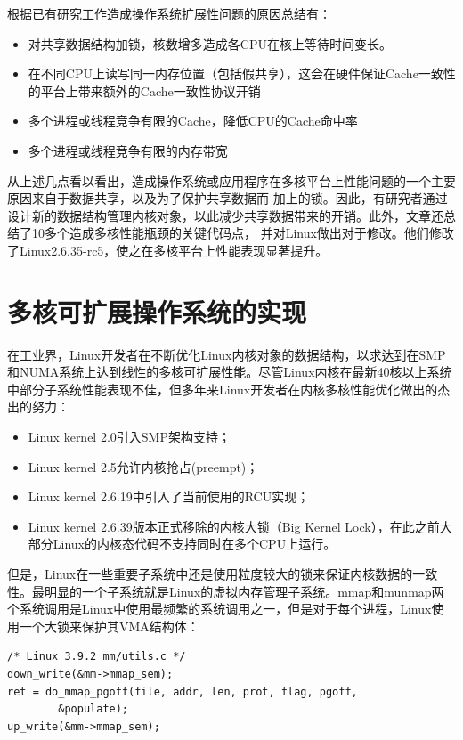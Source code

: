 根据已有研究工作造成操作系统扩展性问题的原因总结有：

\begin{itemize}
\item 对共享数据结构加锁，核数增多造成各CPU在核上等待时间变长。
\item 在不同CPU上读写同一内存位置（包括假共享），这会在硬件保证Cache一致性的平台上带来额外的Cache一致性协议开销
\item 多个进程或线程竞争有限的Cache，降低CPU的Cache命中率
\item 多个进程或线程竞争有限的内存带宽
\end{itemize}

从上述几点看以看出，造成操作系统或应用程序在多核平台上性能问题的一个主要原因来自于数据共享，以及为了保护共享数据而
加上的锁。因此，有研究者通过设计新的数据结构管理内核对象，以此减少共享数据带来的开销。此外，文章还总结了10多个造成多核性能瓶颈的关键代码点，
并对Linux做出对于修改。他们修改了Linux2.6.35-rc5，使之在多核平台上性能表现显著提升。


\section{多核可扩展操作系统的实现}

在工业界，Linux开发者在不断优化Linux内核对象的数据结构，以求达到在SMP和NUMA系统上达到线性的多核可扩展性能。尽管Linux内核在最新40核以上系统中部分子系统性能表现不佳，但多年来Linux开发者在内核多核性能优化做出的杰出的努力：

\begin{itemize}
\item Linux kernel 2.0引入SMP架构支持；
\item Linux kernel 2.5允许内核抢占(preempt)；
\item Linux kernel 2.6.19中引入了当前使用的RCU实现；
\item Linux kernel 2.6.39版本正式移除的内核大锁（Big Kernel
Lock），在此之前大部分Linux的内核态代码不支持同时在多个CPU上运行。
\end{itemize}

但是，Linux在一些重要子系统中还是使用粒度较大的锁来保证内核数据的一致性。最明显的一个子系统就是Linux的虚拟内存管理子系统。mmap和munmap两个系统调用是Linux中使用最频繁的系统调用之一，但是对于每个进程，Linux使用一个大锁来保护其VMA结构体：

\begin{lstlisting}
/* Linux 3.9.2 mm/utils.c */
down_write(&mm->mmap_sem);
ret = do_mmap_pgoff(file, addr, len, prot, flag, pgoff,
		&populate);                        
up_write(&mm->mmap_sem);                               
\end{lstlisting}

